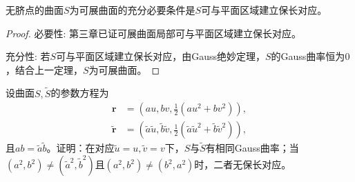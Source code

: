 \documentclass[../../main.tex]{subfiles}%
\begin{document}
\begin{theorem}
无脐点的曲面$S$为可展曲面的充分必要条件是$S$可与平面区域建立保长对应。
\end{theorem}
\begin{proof}

{\heiti 必要性}: 第三章已证可展曲面局部可与平面区域建立保长对应。

{\heiti 充分性}: 若$S$可与平面区域建立保长对应，由Gauss绝妙定理，$S$的Gauss曲率恒为$0$，结合上一定理，$S$为可展曲面。

\end{proof}

\begin{example}
设曲面$S,\tilde{S}$的参数方程为
\begin{align*}
\boldsymbol{r} &= \left(au,bv,\frac{1}{2}(au^2+bv^2)\right),\\
\tilde{\boldsymbol{r}} &= \left(\tilde{a}\tilde{u},\tilde{b}\tilde{v},\frac{1}{2}(\tilde{a}\tilde{u}^2+\tilde{b}\tilde{v}^2)\right),
\end{align*}
且$ab=\tilde{a}\tilde{b}$。证明：在对应$\tilde{u}=u,\tilde{v}=v$下，$S$与$\tilde{S}$有相同Gauss曲率；当$(a^2,b^2)\neq(\tilde{a}^2,\tilde{b}^2)$且$(a^2,b^2)\neq(b^2,a^2)$时，二者无保长对应。
\end{example}
\end{document}
